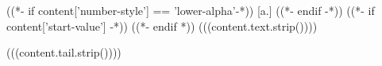 
\begin{enumerate}
((*- if content['number-style'] == 'lower-alpha'-*))
[a.]
((*- endif -*))
((*- if content['start-value'] -*))
\setcounter{enumi}{(((content['start-value']|int - 1)))}
((*- endif *))
(((content.text.strip())))
\end{enumerate}
(((content.tail.strip())))
